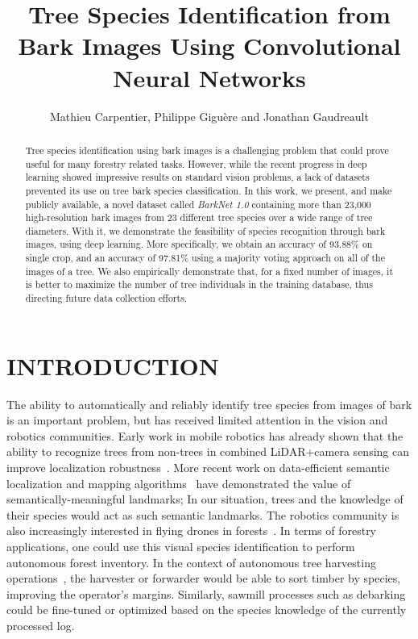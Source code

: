\documentclass[letterpaper, 10 pt, conference]{ieeeconf}  %
\title{\LARGE \bf
Tree Species Identification from Bark Images Using Convolutional Neural Networks
}
\author{Mathieu Carpentier, Philippe Giguère and Jonathan Gaudreault}%
\begin{document}
\maketitle
\thispagestyle{empty}
\pagestyle{empty}


\begin{abstract}
Tree species identification using bark images is a challenging problem that could prove useful for many forestry related tasks. However, while the recent progress in deep learning showed impressive results on standard vision problems, a lack of datasets prevented its use on tree bark species classification. In this work, we present, and make publicly available, a novel dataset called \emph{BarkNet 1.0} containing more than 23,000 high-resolution bark images from 23 different tree species over a wide range of tree diameters. With it, we demonstrate the feasibility of species recognition through bark images, using deep learning. More specifically, we obtain an accuracy of 93.88\% on single crop, and an accuracy of 97.81\% using a majority voting approach on all of the images of a tree. We also empirically demonstrate that, for a fixed number of images, it is better to maximize the number of tree individuals in the training database, thus directing future data collection efforts.


\end{abstract}


\section{INTRODUCTION}

The ability to automatically and reliably identify tree species from images of bark is an important problem, but has received limited attention in the vision and robotics communities. Early work in mobile robotics has already shown that the ability to recognize trees from non-trees in combined LiDAR+camera sensing can improve localization robustness~\cite{TreeLiDAR2007}. More recent work on data-efficient semantic localization and mapping algorithms~\cite{MatrixPermanent,Toudeshki2018} have demonstrated the value of semantically-meaningful landmarks; In our situation, trees and the knowledge of their species would act as such semantic landmarks. The robotics community is also increasingly interested in flying drones in forests~\cite{SmolyanskiyKSB17}. In terms of forestry applications, one could use this visual species identification to perform autonomous forest inventory. In the context of autonomous tree harvesting operations~\cite{IJFE12426}, the harvester or forwarder would be able to sort timber by species, improving the operator's margins. Similarly, sawmill processes such as debarking could be fine-tuned or optimized based on the species knowledge of the currently processed log. 
\end{document}
